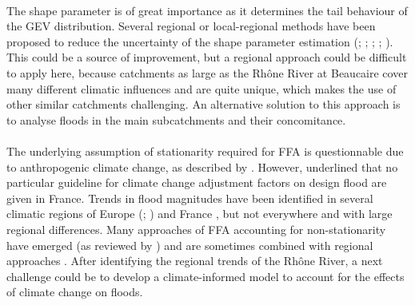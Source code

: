 \documentclass[11pt]{article}
\begin{document}
    \paragraph{}
    The shape parameter is of great importance as it determines the tail behaviour of the GEV distribution. Several regional or local-regional methods have been proposed to reduce the uncertainty of the shape parameter estimation (\citet{burn_evaluation_1990}; \citet{ouarda_regional_2001}; \citet{ribatet_regional_2007}; \citet{micevski_combining_2009}; \citet{haddad_regional_2012}). This could be a source of improvement, but a regional approach could be difficult to apply here, because catchments as large as the Rhône River at Beaucaire cover many different climatic influences and are quite unique, which makes the use of other similar catchments challenging. An alternative solution to this approach is to analyse floods in the main subcatchments and their concomitance.
    \paragraph{}The underlying assumption of stationarity required for FFA is questionnable due to anthropogenic climate change, as described by \citet{milly_stationarity_2008}. However, \citet{madsen_review_2014} underlined that no particular guideline for climate change adjustment factors on design flood are given in France. Trends in flood magnitudes have been identified in several climatic regions of Europe (\citet{hall_understanding_2014}; \citet{bloschl_changing_2019}) and France \citep{giuntoli_floods_2019}, but not everywhere and with large regional differences. Many approaches of FFA accounting for non-stationarity have emerged (as reviewed by \citet{salas_techniques_2018}) and are sometimes combined with regional approaches \citep{han_incorporating_2022}. After identifying the regional trends of the Rhône River, a next challenge could be to develop a climate-informed model to account for the effects of climate change on floods.
    
\end{document}
